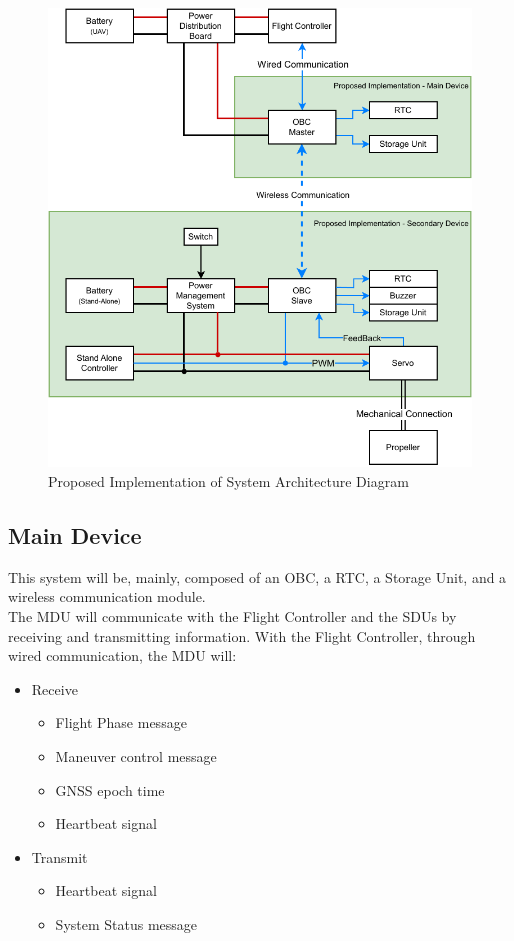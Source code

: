 \begin{figure}[H]
    \centering
    \includegraphics[width=\textwidth,keepaspectratio]{ch4/assets/system_diagram.pdf}
    \caption{Proposed Implementation of System Architecture Diagram}
    \label{system_diagram}
\end{figure}


\subsection{Main Device}
This system will be, mainly, composed of an \gls{OBC}, a \gls{RTC}, a Storage Unit, and a wireless communication module.\\
The MDU will communicate with the Flight Controller and the SDUs by receiving and transmitting information.
With the Flight Controller, through wired communication, the MDU will:
\begin{itemize}
    \item Receive
          \begin{itemize}
              \item Flight Phase message
              \item Maneuver control message
              \item \gls{GNSS} epoch time
              \item Heartbeat signal
          \end{itemize}
    \item Transmit
          \begin{itemize}
              \item Heartbeat signal
              \item System Status message
          \end{itemize}
\end{itemize}

